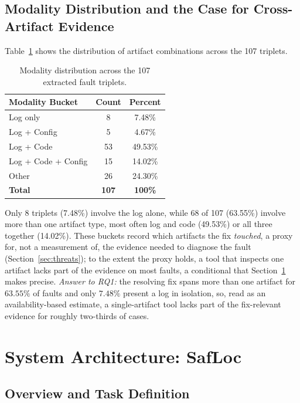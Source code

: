 \documentclass[runningheads]{llncs}
\begin{document}
\subsection{Modality Distribution and the Case for Cross-Artifact Evidence}
\label{sec:modality}

Table~\ref{tab:modality} shows the distribution of artifact combinations across the 107 triplets.

\begin{table}
  \centering
  \caption{Modality distribution across the 107 extracted fault triplets.}
  \label{tab:modality}
  \begin{tabular}{lcc}
    \toprule
    Modality Bucket        & Count & Percent \\
    \midrule
    Log only               & 8   & 7.48\%  \\
    Log + Config           & 5   & 4.67\%  \\
    Log + Code             & 53  & 49.53\% \\
    Log + Code + Config    & 15  & 14.02\% \\
    Other                  & 26  & 24.30\% \\
    \midrule
    \textbf{Total}         & \textbf{107} & \textbf{100\%} \\
    \bottomrule
  \end{tabular}
\end{table}

Only 8 triplets (7.48\%) involve the log alone, while 68 of 107 (63.55\%) involve more than one artifact type, most often log and code (49.53\%) or all three together (14.02\%). These buckets record which artifacts the fix \emph{touched}, a proxy for, not a measurement of, the evidence needed to diagnose the fault (Section~\ref{sec:threats}); to the extent the proxy holds, a tool that inspects one artifact lacks part of the evidence on most faults, a conditional that Section~\ref{sec:architecture} makes precise. \emph{Answer to RQ1:} the resolving fix spans more than one artifact for $63.55\%$ of faults and only $7.48\%$ present a log in isolation, so, read as an availability-based estimate, a single-artifact tool lacks part of the fix-relevant evidence for roughly two-thirds of cases.

\section{System Architecture: SafLoc}
\label{sec:architecture}

\subsection{Overview and Task Definition}
\end{document}
